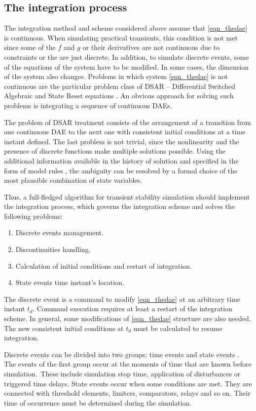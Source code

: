 \documentclass[lettersize,journal]{IEEEtran}
\begin{document}
\subsection {The integration process}
The integration method and scheme considered above assume that \eqref{eqn_thedae} is continuous. When simulating practical transients, this condition is not met since some of the \(f\) and \(g\) or their derivatives are not continuous due to constraints or the are just discrete. In addition, to simulate discrete events, some of the equations of the system have to be modified. In some cases, the dimension of the system also changes. Problems in which system \eqref{eqn_thedae} is not continuous are the particular problem class of DSAR -- Differential Switched Algebraic and State Reset equations \cite{Hiskens01}. An obvious approach for solving such problems is integrating a sequence of continuous DAEs.

The problem of DSAR treatment consists of the arrangement of a transition from one continuous DAE to the next one with consistent initial conditions at a time instant defined. The last problem is not trivial, since the nonlinearity and the presence of discrete functions make multiple solutions possible. Using the additional information available in the history of solution and specified in the form of model rules \cite{mycompiler}, the ambiguity can be resolved by a formal choice of the most plausible combination of state variables.

Thus, a full-fledged algorithm for transient stability simulation should implement the integration process, which governs the integration scheme and solves the following problems:
\begin{enumerate}
	\item Discrete events management.
	\item Discontinuities handling.
	\item Calculation of initial conditions and restart of integration.
	\item State events time instant's location.
\end{enumerate}

The discrete event is a command to modify \eqref{eqn_thedae} at an arbitrary time instant \(t_d\). Command execution requires at least a restart of the integration scheme. In general, some modifications of \eqref{eqn_thedae} structure are also needed. The new consistent initial conditions at \(t_d\) must be calculated to resume integration.

Discrete events can be divided into two groups: time events and state events \cite{cellier06}.  The events of the first group occur at the moments of time that are known before simulation. These include simulation stop time, application of disturbances or triggered time delays. State events occur when some conditions are met. They are connected with threshold elements, limiters, comparators, relays and so on.  Their time of occurrence must be determined during the simulation. 
\end{document}
